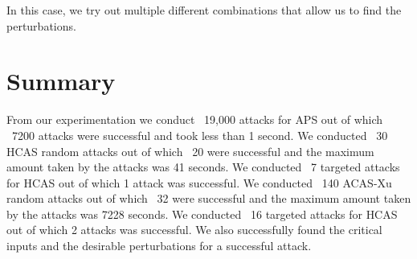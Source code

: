 In this case, we try out multiple different combinations that allow us to find the perturbations.

\section{Summary}
From our experimentation we conduct ~19,000 attacks for \ac{APS} out of which ~7200 attacks were successful and took less than 1 second. 
We conducted ~30 \ac{HCAS} random attacks out of which ~20 were successful and the maximum amount taken by the attacks was 41 seconds. 
We conducted ~7 targeted attacks for \ac{HCAS} out of which 1 attack was successful.
We conducted ~140 \ac{ACAS-Xu} random attacks out of which ~32 were successful and the maximum amount taken by the attacks was 7228 seconds. 
We conducted ~16 targeted attacks for \ac{HCAS} out of which 2 attacks was successful.
We also successfully found the critical inputs and the desirable perturbations for a successful attack. 

